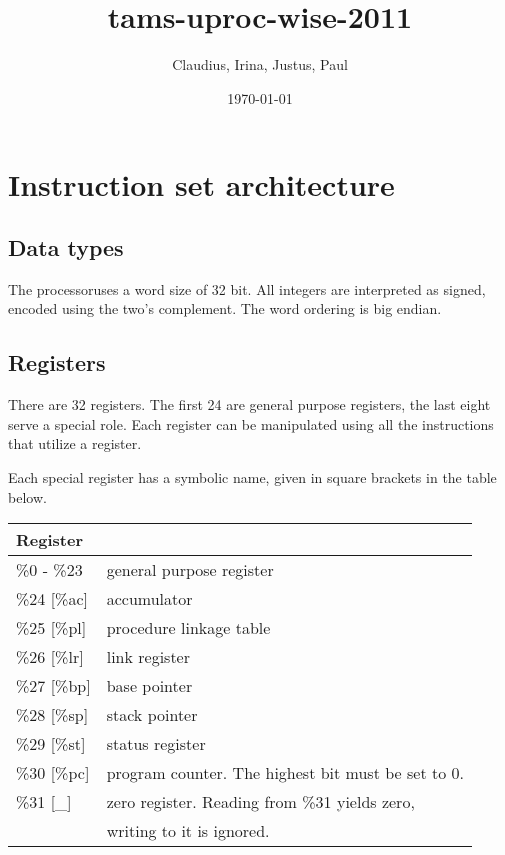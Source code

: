 \documentclass{article}
\author{Claudius, Irina, Justus, Paul}
\title{\cpu\\
tams-uproc-wise-2011}
\date{\today}
\newcommand{\cpu}{processor}
\begin{document}
\maketitle
\newpage

\tableofcontents
\newpage

\section{Instruction set architecture}

\subsection{Data types}

The \cpu uses a word size of 32 bit. All integers are interpreted as
signed, encoded using the two's complement. The word ordering is big
endian.

\subsection{Registers}

There are 32 registers. The first 24 are general purpose registers,
the last eight serve a special role. Each register can be manipulated
using all the instructions that utilize a register.

Each special register has a symbolic name, given in square brackets in
the table below.

\begin{center}
  \begin{tabular}{l|l}
    Register & \\
    \hline
    \%0 - \%23   & general purpose register \\
    \%24 [\%ac]  & accumulator \\
    \%25 [\%pl]  & procedure linkage table \\
    \%26 [\%lr]  & link register \\
    \%27 [\%bp]  & base pointer \\
    \%28 [\%sp]  & stack pointer \\
    \%29 [\%st]  & status register \\
    \%30 [\%pc]  & program counter. The highest bit must be set to 0. \\
    \%31 [\_]    & zero register. Reading from \%31 yields zero, \\
                 & writing to it is ignored. \\
  \end{tabular}
\end{center}
\end{document}
